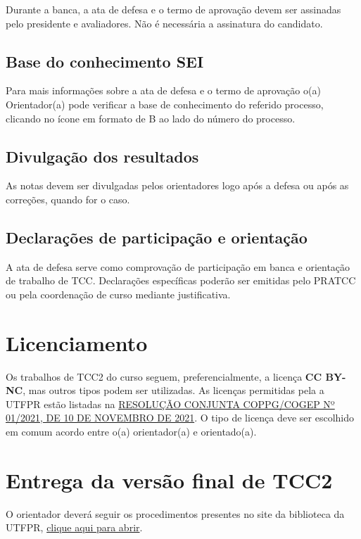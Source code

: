 \documentclass[a4paper, 12pt]{article}
\begin{document}
	Durante a banca, a ata de defesa e o termo de aprovação devem ser assinadas pelo presidente e avaliadores. Não é necessária a assinatura do candidato. 
	
	\subsection{Base do conhecimento SEI}
	
	Para mais informações sobre a ata de defesa e o termo de aprovação o(a) Orientador(a) pode verificar a base de conhecimento do referido processo, clicando no ícone em formato de B ao lado do número do processo.
	
	\subsection{Divulgação dos resultados}
	
	As notas devem ser divulgadas pelos orientadores logo após a defesa ou após as correções, quando for o caso.

	\subsection{Declarações de participação e orientação}

	A ata de defesa serve como comprovação de participação em banca e orientação de trabalho de TCC. Declarações específicas poderão ser emitidas pelo PRATCC ou pela coordenação de curso mediante justificativa.
	
	\section{Licenciamento}
	
	Os trabalhos de TCC2 do curso seguem, preferencialmente, a licença \textbf{CC BY-NC}, mas outros tipos podem ser utilizadas. As licenças permitidas pela a UTFPR estão listadas na \href{https://sei.utfpr.edu.br/sei/publicacoes/controlador_publicacoes.php?acao=publicacao_visualizar&id_documento=2615190&id_orgao_publicacao=0}{RESOLUÇÃO CONJUNTA COPPG/COGEP Nº 01/2021, DE 10 DE NOVEMBRO DE 2021}. O tipo de licença deve ser escolhido em comum acordo entre o(a) orientador(a) e orientado(a).
	
	\section{Entrega da versão final de TCC2}
	
	O orientador deverá seguir os procedimentos presentes no site da biblioteca da UTFPR, \href{http://portal.utfpr.edu.br/biblioteca/trabalhos-academicos/docentes/procedimento-de-entrega-graduacao}{clique aqui para abrir}.
	
\end{document}
